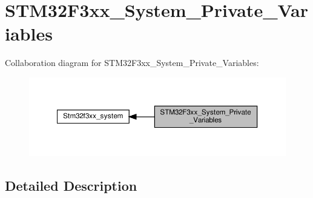 \hypertarget{group__STM32F3xx__System__Private__Variables}{}\section{S\+T\+M32\+F3xx\+\_\+\+System\+\_\+\+Private\+\_\+\+Variables}
\label{group__STM32F3xx__System__Private__Variables}
Collaboration diagram for S\+T\+M32\+F3xx\+\_\+\+System\+\_\+\+Private\+\_\+\+Variables\+:\nopagebreak
\begin{figure}[H]
\begin{center}
\leavevmode
\includegraphics[width=350pt]{group__STM32F3xx__System__Private__Variables}
\end{center}
\end{figure}


\subsection{Detailed Description}

